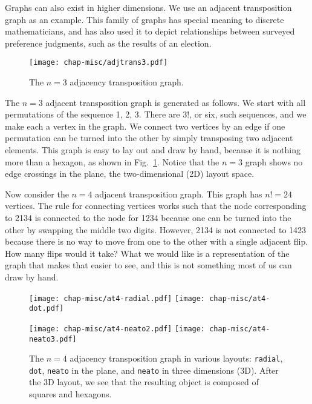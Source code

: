 Graphs can also exist in higher dimensions. We use an adjacent
transposition graph as an example.  This family of graphs has special
meaning to discrete mathematicians, and
 has also used it to depict relationships between
surveyed preference judgments, such as the results of an election.

\begin{figure}[htbp]
\centerline{\texttt{[image: chap-misc/adjtrans3.pdf]}}
\caption[The $n=3$ adjacency transposition graph]{The $n=3$ adjacency 
transposition graph.}
\label{adjtrans3}
\end{figure}

The $n = 3$ adjacent transposition graph is generated as follows.  We
start with all permutations of the sequence 1, 2, 3. There are $3!$,
or six, such sequences, and we make each a vertex in the graph. We
connect two vertices by an edge if one permutation can be turned into
the other by simply transposing two adjacent elements.  This graph is
easy to lay out and draw by hand, because it is nothing more than a
hexagon, as shown in Fig.~\ref{adjtrans3}.  Notice that the $n = 3$
graph shows no edge crossings in the plane, the two-dimensional (2D)
layout space.

Now consider the $n = 4$ adjacent transposition graph.  This graph has
$n! = 24$ vertices.  The rule for connecting vertices works such that
the node corresponding to 2134 is connected to the node for 1234
because one can be turned into the other by swapping the middle two
digits. However, 2134 is not connected to 1423 because there is no way
to move from one to the other with a single adjacent flip.  How many
flips would it take?  What we would like is a representation of the graph
that makes that easier to see, and this is not something most of us
can draw by hand.

\begin{figure}[htbp]
\centerline{
  \texttt{[image: chap-misc/at4-radial.pdf]}
  \texttt{[image: chap-misc/at4-dot.pdf]}
}
\centerline{
  \texttt{[image: chap-misc/at4-neato2.pdf]}
  \texttt{[image: chap-misc/at4-neato3.pdf]}
}
\caption[The $n=4$ adjacency transposition graph in various
layouts]{The $n=4$ adjacency transposition graph in various layouts:
{\tt radial}, {\tt dot}, {\tt neato} in the plane, and {\tt neato} in
three dimensions (3D).  After the 3D layout, we see that the resulting
object is composed of squares and hexagons.}
\label{adjtrans4}
\end{figure}


